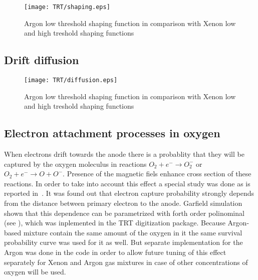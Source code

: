 \begin{figure}
\begin{center}
 \texttt{[image: TRT/shaping.eps]}
\caption{\label{fig:shaping} Argon low threshold shaping function in comparison with Xenon low and high treshold shaping functions}
\end{center}
\end{figure}





\subsection{Drift diffusion}


\begin{figure}
\begin{center}
\texttt{[image: TRT/diffusion.eps]}
\caption{Argon low threshold shaping function in comparison with Xenon low and high treshold shaping functions}
\label{fig:shaping}
\end{center}
\end{figure}


\subsection{Electron attachment processes in oxygen}
\label{subsec:recapture}
When electrons drift towards the anode there is a probablity that they will be captured by the oxygen moleculus in reactions
$O_2 + e^- \to O_2^-$ or $O_2 + e^- \to O + O^-$. Presence of the magnetic fiels enhance cross section of these reactions.
In order to take into account this effect a special study was done as is reported in~\cite{esben_thesis}.
It was found out that electron capture probability strongly depends from the distance between primary electron to the anode.
Garfield simulation shown that this dependence can be parametrized with forth order polinominal (see ), 
which was inplemented in the TRT digitization package. 
Because Argon-based mixture contain the same amount of the oxygen in it the same survival probability
curve was used for it as well. But separate implementation for the Argon was done in the code in order to allow future tuning of this effect separately for Xenon and Argon gas mixtures
in case of other concentrations of oxygen will be used.

